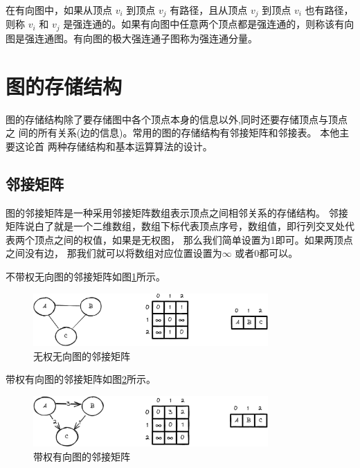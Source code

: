 \documentclass[lang=cn,newtx,10pt,scheme=chinese]{elegantbook}
\begin{document}
在有向图中，如果从顶点 $v_i$ 到顶点 $v_j$ 有路径，且从顶点 $v_j$ 到顶点 $v_i$ 也有路径，则称 $v_i$ 和 $v_j$ 是强连通的。如果有向图中任意两个顶点都是强连通的，则称该有向图是强连通图。有向图的极大强连通子图称为强连通分量。




\section{图的存储结构}
图的存储结构除了要存储图中各个顶点本身的信息以外,同时还要存储顶点与顶点之
间的所有关系(边的信息)。常用的图的存储结构有邻接矩阵和邻接表。 本他主要这论首
两种存储结构和基本运算算法的设计。

\subsection{邻接矩阵}
图的邻接矩阵是一种采用邻接矩阵数组表示顶点之间相邻关系的存储结构。
邻接矩阵说白了就是一个二维数组，数组下标代表顶点序号，数组值，即行列交叉处代表两个顶点之间的权值，如果是无权图，
那么我们简单设置为1即可。如果两顶点之间没有边，
那我们就可以将数组对应位置设置为$\infty$ 或者0都可以。

不带权无向图的邻接矩阵如图\ref{fig:adjacencyMatrix_UnWeightUndirected}所示。

\begin{figure}[h!]
  \centering
  \includegraphics[width=0.8\textwidth]{./figure/pdf/cropped/adjacencyMatrix_UnWeightUndirected.pdf}
  \caption{无权无向图的邻接矩阵}
  \label{fig:adjacencyMatrix_UnWeightUndirected}
\end{figure}

带权有向图的邻接矩阵如图\ref{fig:adjacencyMatrix_WeightedDirected}所示。

\begin{figure}[h!]
  \centering
  \includegraphics[width=0.8\textwidth]{./figure/pdf/cropped/adjacencyMatrix_weightDirected.pdf}
  \caption{带权有向图的邻接矩阵}
  \label{fig:adjacencyMatrix_WeightedDirected}
\end{figure}
\end{document}
